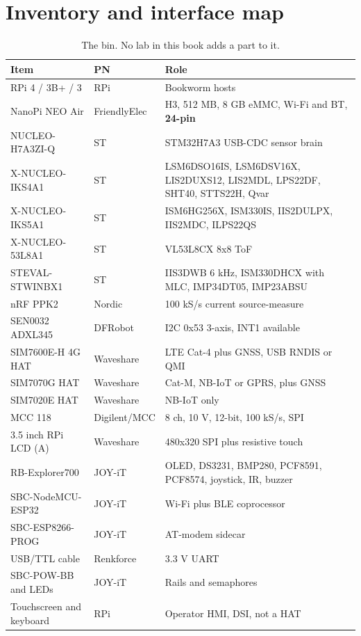\section*{Inventory and interface map}

\begin{table}[H]\centering\small
\begin{tabular}{p{36mm}p{24mm}p{88mm}}
\toprule
Item & PN & Role \\
\midrule
RPi 4 / 3B+ / 3 & RPi & Bookworm hosts \\
NanoPi NEO Air & FriendlyElec & H3, 512 MB, 8 GB eMMC, Wi-Fi and BT, \textbf{24-pin} \\
NUCLEO-H7A3ZI-Q & ST & STM32H7A3 USB-CDC sensor brain \\
X-NUCLEO-IKS4A1 & ST & LSM6DSO16IS, LSM6DSV16X, LIS2DUXS12, LIS2MDL, LPS22DF, SHT40, STTS22H, Qvar \\
X-NUCLEO-IKS5A1 & ST & ISM6HG256X, ISM330IS, IIS2DULPX, IIS2MDC, ILPS22QS \\
X-NUCLEO-53L8A1 & ST & VL53L8CX 8x8 ToF \\
STEVAL-STWINBX1 & ST & IIS3DWB 6 kHz, ISM330DHCX with MLC, IMP34DT05, IMP23ABSU \\
nRF PPK2 & Nordic & 100 kS/s current source-measure \\
SEN0032 ADXL345 & DFRobot & I2C 0x53 3-axis, INT1 available \\
SIM7600E-H 4G HAT & Waveshare & LTE Cat-4 plus GNSS, USB RNDIS or QMI \\
SIM7070G HAT & Waveshare & Cat-M, NB-IoT or GPRS, plus GNSS \\
SIM7020E HAT & Waveshare & NB-IoT only \\
MCC 118 & Digilent/MCC & 8 ch, 10 V, 12-bit, 100 kS/s, SPI \\
3.5 inch RPi LCD (A) & Waveshare & 480x320 SPI plus resistive touch \\
RB-Explorer700 & JOY-iT & OLED, DS3231, BMP280, PCF8591, PCF8574, joystick, IR, buzzer \\
SBC-NodeMCU-ESP32 & JOY-iT & Wi-Fi plus BLE coprocessor \\
SBC-ESP8266-PROG & JOY-iT & AT-modem sidecar \\
USB/TTL cable & Renkforce & 3.3 V UART \\
SBC-POW-BB and LEDs & JOY-iT & Rails and semaphores \\
Touchscreen and keyboard & RPi & Operator HMI, DSI, not a HAT \\
\bottomrule
\end{tabular}
\caption{The bin. No lab in this book adds a part to it.}
\end{table}


